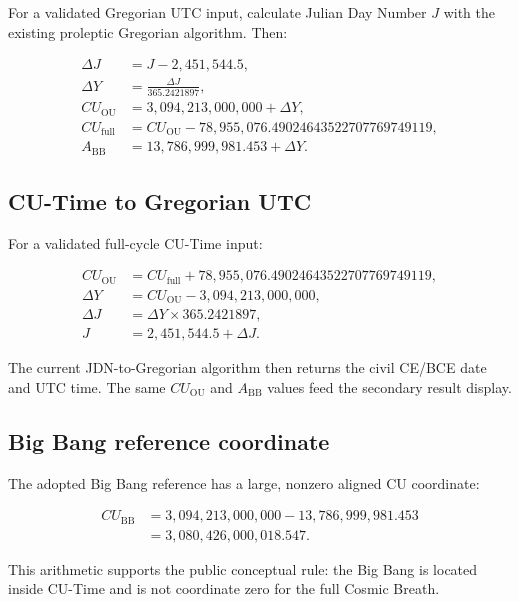 \documentclass[11pt,letterpaper]{article}
\begin{document}
For a validated Gregorian UTC input, calculate Julian Day Number \(J\) with the
existing proleptic Gregorian algorithm. Then:

\begin{align*}
\Delta J &= J - 2{,}451{,}544.5, \\
\Delta Y &= \frac{\Delta J}{365.2421897}, \\
CU_{\mathrm{OU}} &= 3{,}094{,}213{,}000{,}000 + \Delta Y, \\
CU_{\mathrm{full}} &= CU_{\mathrm{OU}}
- 78{,}955{,}076.49024643522707769749119, \\
A_{\mathrm{BB}} &= 13{,}786{,}999{,}981.453 + \Delta Y.
\end{align*}

\subsection{CU-Time to Gregorian UTC}

For a validated full-cycle CU-Time input:

\begin{align*}
CU_{\mathrm{OU}} &= CU_{\mathrm{full}}
+ 78{,}955{,}076.49024643522707769749119, \\
\Delta Y &= CU_{\mathrm{OU}} - 3{,}094{,}213{,}000{,}000, \\
\Delta J &= \Delta Y\times365.2421897, \\
J &= 2{,}451{,}544.5 + \Delta J.
\end{align*}

The current JDN-to-Gregorian algorithm then returns the civil CE/BCE date and
UTC time. The same \(CU_{\mathrm{OU}}\) and \(A_{\mathrm{BB}}\) values feed the
secondary result display.

\subsection{Big Bang reference coordinate}

The adopted Big Bang reference has a large, nonzero aligned CU coordinate:

\begin{align*}
CU_{\mathrm{BB}} &= 3{,}094{,}213{,}000{,}000
- 13{,}786{,}999{,}981.453 \\
&= 3{,}080{,}426{,}000{,}018.547.
\end{align*}

This arithmetic supports the public conceptual rule: the Big Bang is located
inside CU-Time and is not coordinate zero for the full Cosmic Breath.
\end{document}
